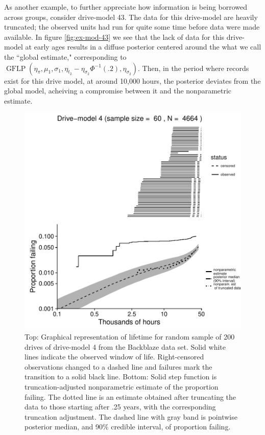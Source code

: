 \documentclass[12pt]{article}
\newcommand{\op}{\operatorname}
\begin{document}
As another example, to further appreciate how information is being borrowed across groups, consider drive-model 43. The data for this drive-model are heavily truncated; the observed units had run for quite some time before data were made available. In figure \ref{fig:ex-mod-43} we see that the lack of data for this drive-model at early ages results in a diffuse posterior centered around the what we call the ``global estimate," corresponding to $\op{GFLP}(\eta_{\pi}, \mu_1,\sigma_1, \eta_{t_2} - \eta_{\sigma_2}\Phi^{-1}(.2), \eta_{\sigma_2})$. Then, in the period where records exist for this drive model, at around 10,000 hours, the posterior deviates from the global model, acheiving a compromise between it and the nonparametric estimate.



\begin{figure}
\centering
\includegraphics{dm4-exception}
\caption{Top: Graphical representation of lifetime for random sample of 200 drives of drive-model 4 from the Backblaze data set. Solid white lines indicate the observed window of life. Right-censored observations changed to a dashed line and failures mark the transition to a solid black line. Bottom: Solid step function is truncation-adjusted nonparametric estimate of the proportion failing. The dotted line is an estimate obtained after truncating the data to those starting after .25 years, with the corresponding truncation adjustment. The dashed line with gray band is pointwise posterior median, and 90\% credible interval, of proportion failing.}

\label{fig:ex-mod-4}
\end{figure}
\end{document}
